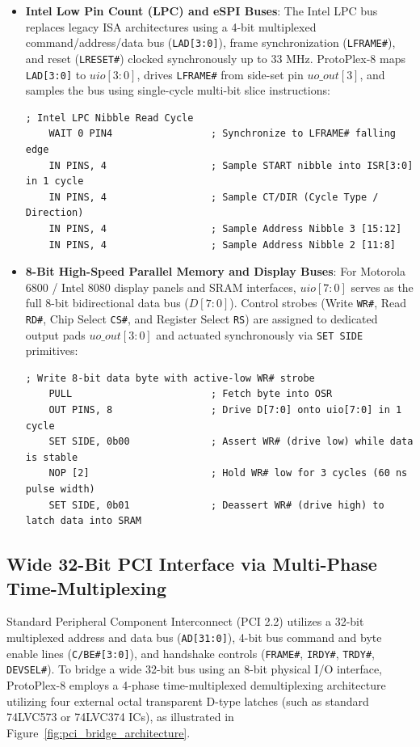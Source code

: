 \documentclass[11pt,a4paper]{article}
\begin{document}
\begin{itemize}
    \item \textbf{Intel Low Pin Count (LPC) and eSPI Buses}: The Intel LPC bus replaces legacy ISA architectures using a 4-bit multiplexed command/address/data bus (\texttt{LAD[3:0]}), frame synchronization (\texttt{LFRAME\#}), and reset (\texttt{LRESET\#}) clocked synchronously up to $33\text{ MHz}$. ProtoPlex-8 maps \texttt{LAD[3:0]} to $uio[3:0]$, drives \texttt{LFRAME\#} from side-set pin $uo\_out[3]$, and samples the bus using single-cycle multi-bit slice instructions:
    \begin{lstlisting}[language={[x86masm]Assembler}]
    ; Intel LPC Nibble Read Cycle
    WAIT 0 PIN4                 ; Synchronize to LFRAME# falling edge
    IN PINS, 4                  ; Sample START nibble into ISR[3:0] in 1 cycle
    IN PINS, 4                  ; Sample CT/DIR (Cycle Type / Direction)
    IN PINS, 4                  ; Sample Address Nibble 3 [15:12]
    IN PINS, 4                  ; Sample Address Nibble 2 [11:8]
    \end{lstlisting}
    \item \textbf{8-Bit High-Speed Parallel Memory and Display Buses}: For Motorola 6800 / Intel 8080 display panels and SRAM interfaces, $uio[7:0]$ serves as the full 8-bit bidirectional data bus ($D[7:0]$). Control strobes (Write \texttt{WR\#}, Read \texttt{RD\#}, Chip Select \texttt{CS\#}, and Register Select \texttt{RS}) are assigned to dedicated output pads $uo\_out[3:0]$ and actuated synchronously via \texttt{SET SIDE} primitives:
    \begin{lstlisting}[language={[x86masm]Assembler}]
    ; Write 8-bit data byte with active-low WR# strobe
    PULL                        ; Fetch byte into OSR
    OUT PINS, 8                 ; Drive D[7:0] onto uio[7:0] in 1 cycle
    SET SIDE, 0b00              ; Assert WR# (drive low) while data is stable
    NOP [2]                     ; Hold WR# low for 3 cycles (60 ns pulse width)
    SET SIDE, 0b01              ; Deassert WR# (drive high) to latch data into SRAM
    \end{lstlisting}
\end{itemize}

\subsection{Wide 32-Bit PCI Interface via Multi-Phase Time-Multiplexing}
Standard Peripheral Component Interconnect (PCI 2.2) utilizes a 32-bit multiplexed address and data bus (\texttt{AD[31:0]}), 4-bit bus command and byte enable lines (\texttt{C/BE\#[3:0]}), and handshake controls (\texttt{FRAME\#}, \texttt{IRDY\#}, \texttt{TRDY\#}, \texttt{DEVSEL\#}). To bridge a wide 32-bit bus using an 8-bit physical I/O interface, ProtoPlex-8 employs a 4-phase time-multiplexed demultiplexing architecture utilizing four external octal transparent D-type latches (such as standard 74LVC573 or 74LVC374 ICs), as illustrated in Figure~\ref{fig:pci_bridge_architecture}.
\end{document}
